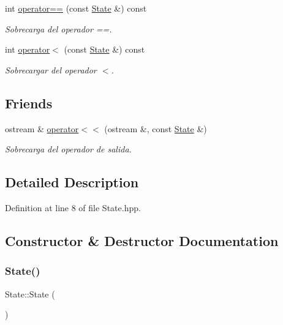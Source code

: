 \begin{DoxyCompactItemize}
\item 
int \hyperlink{class_state_a6a848174b67647a6a7a3ce467260eb7f}{operator==} (const \hyperlink{class_state}{State} \&) const
\begin{DoxyCompactList}\small\item\em Sobrecarga del operador ==. \end{DoxyCompactList}\item 
int \hyperlink{class_state_a7771d67d4ef98c2fd8ab7924e757781c}{operator$<$} (const \hyperlink{class_state}{State} \&) const
\begin{DoxyCompactList}\small\item\em Sobrecargar del operador $<$. \end{DoxyCompactList}\end{DoxyCompactItemize}
\subsection*{Friends}
\begin{DoxyCompactItemize}
\item 
ostream \& \hyperlink{class_state_a9e1d00045023572e9e6dc0d0a199e49a}{operator$<$$<$} (ostream \&, const \hyperlink{class_state}{State} \&)
\begin{DoxyCompactList}\small\item\em Sobrecarga del operador de salida. \end{DoxyCompactList}\end{DoxyCompactItemize}


\subsection{Detailed Description}


Definition at line 8 of file State.\+hpp.



\subsection{Constructor \& Destructor Documentation}
\mbox{\label{class_state_ab91bb1dd5aa6260ab2a456581daf9ec2}} 
\subsubsection{\texorpdfstring{State()}{State()}\hspace{0.1cm}{\footnotesize\ttfamily [1/2]}}
{\footnotesize\ttfamily State\+::\+State (\begin{DoxyParamCaption}{ }\end{DoxyParamCaption})}



